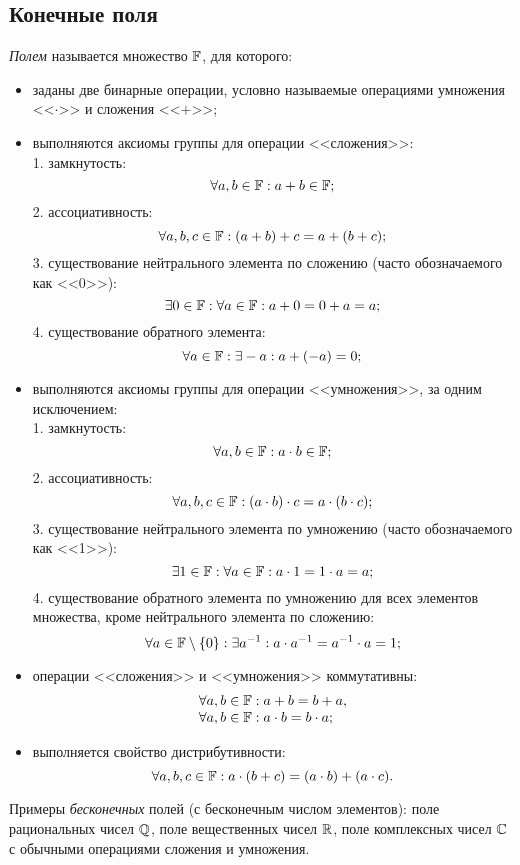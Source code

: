 \subsection{Конечные поля}\label{section-fields}

\emph{Полем} называется множество $\mathbb{F}$, для которого:
\begin{itemize}
    \item заданы две бинарные операции, условно называемые операциями умножения <<$\cdot$>> и сложения <<$+$>>;
    \item выполняются аксиомы группы для операции <<сложения>>: \\
        1. замкнутость:
		\[\forall a, b \in \mathbb{F}: a + b \in \mathbb{F};\]
        2. ассоциативность:
		\[\forall a, b, c \in \mathbb{F}: (a+b)+c = a+(b+c);\]
        3. существование нейтрального элемента по сложению (часто обозначаемого как <<0>>):
		\[\exists 0 \in \mathbb{F}: \forall a \in \mathbb{F}: a + 0 = 0 + a = a; \]
        4. существование обратного элемента:
		\[\forall a \in \mathbb{F}: \exists -a: a + (-a) = 0; \]
    \item выполняются аксиомы группы для операции <<умножения>>, за одним исключением: \\
        1. замкнутость:
		\[\forall a, b \in \mathbb{F}: a \cdot b \in \mathbb{F}; \]
        2. ассоциативность:
		\[\forall a, b, c \in \mathbb{F}: (a \cdot b) \cdot c = a \cdot (b \cdot c);\]
        3. существование нейтрального элемента по умножению (часто обозначаемого как <<1>>):
		\[\exists 1 \in \mathbb{F}: \forall a \in \mathbb{F}: a \cdot 1 = 1 \cdot a = a;\]
        4. существование обратного элемента по умножению для всех элементов множества, кроме нейтрального элемента по сложению:
		\[\forall a \in {\mathbb{F}\setminus \{0\}}: \exists a^{-1}: a \cdot a^{-1} = a^{-1} \cdot a = 1;\]
    \item операции <<сложения>> и <<умножения>> коммутативны: \\
        \[ \begin{array}{l}
            \forall a, b \in \mathbb{F}: a + b = b + a, \\
            \forall a, b \in \mathbb{F}: a \cdot b = b \cdot a; \\
        \end{array} \]
    \item выполняется свойство дистрибутивности:
        \[ \forall a, b, c \in \mathbb{F}: a \cdot (b + c) = (a \cdot b) + (a \cdot c). \]
\end{itemize}

Примеры \emph{бесконечных} полей (с бесконечным числом элементов): поле рациональных чисел $\mathbb{Q}$, поле вещественных чисел $\mathbb{R}$, поле комплексных чисел $\mathbb{C}$ с обычными операциями сложения и умножения.

